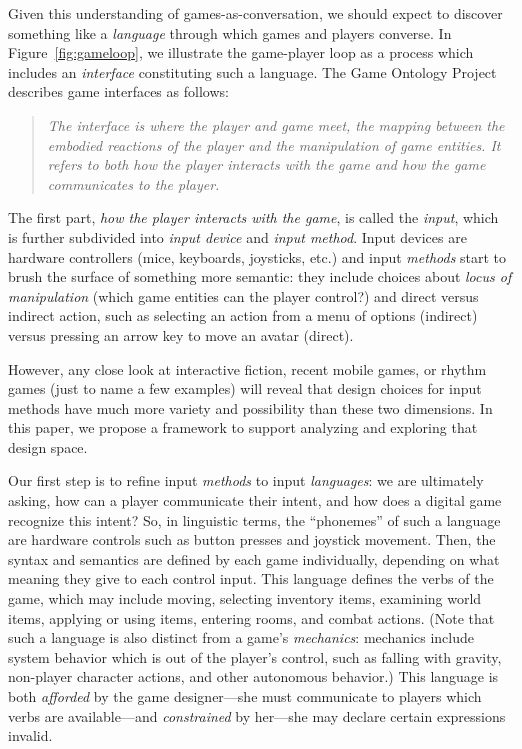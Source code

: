 \documentclass[sigconf]{acmart}
\begin{document}
Given this understanding of games-as-conversation, we should expect to
discover something like a {\em language} through which games and players converse. 
In Figure~\ref{fig:gameloop}, we illustrate the game-player loop as a
process which includes an {\em interface} constituting such a language.
The Game Ontology Project~\cite{zagal2007towards} describes game interfaces
as follows:
\begin{quote} \em
The interface is where the player and game meet, the mapping
between the embodied reactions of the player and the manipulation of game
entities. It refers to both how the player interacts with the game and how
the game communicates to the player.
\end{quote}
The first part, {\em how the player interacts with the game}, is
called the {\em input}, which is further subdivided into {\em input device}
and {\em input method}. Input devices are hardware controllers (mice,
keyboards, joysticks, etc.) and input {\em methods} start to brush the
surface of something more semantic: they include choices about {\em locus of
manipulation} (which game entities can the player control?) and direct
versus indirect action, such as selecting an action from a menu of options
(indirect) versus pressing an arrow key to move an avatar (direct).

However, any close look at interactive fiction, recent mobile games, or
rhythm games (just to name a few examples) will reveal that design choices
for input methods have much more variety and possibility than these two
dimensions. In this paper, we propose a framework to support analyzing and exploring
that design space. 

Our first step is to refine input {\em methods} to input {\em languages}:
we are ultimately asking, how can a player communicate their intent, and
how does a digital game recognize this intent?  So, in linguistic terms,
the ``phonemes'' of such a language are hardware controls such as button
presses and joystick movement. Then, the syntax and semantics are defined
by each game individually, depending on what meaning they give to each
control input. This language defines the verbs of the game, which may
include moving, selecting inventory items, examining world items, applying
or using items, entering rooms, and combat actions.  (Note that such a
language is also distinct from a game's {\em mechanics}: mechanics include
system behavior which is out of the player's control, such as falling with
gravity, non-player character actions, and other autonomous behavior.) This
language is both {\em afforded} by the game designer---she must communicate
to players which verbs are available---and {\em constrained} by her---she
may declare certain expressions invalid.
\end{document}
